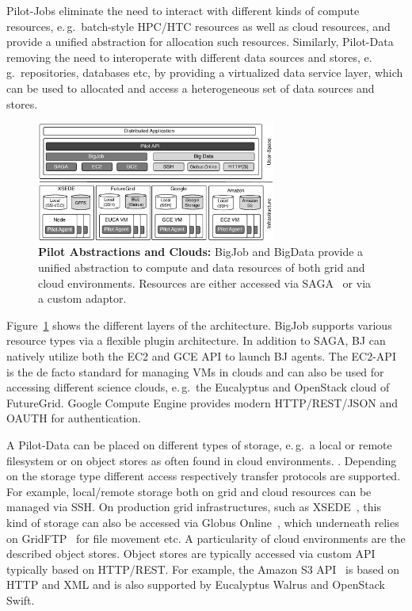 \documentclass[times]{cpeauth}
\newcommand{\pilotjobs}{Pilot-Jobs\xspace}
\newcommand{\pilotdata}{Pilot-Data\xspace}
\begin{document}
\pilotjobs eliminate the need to interact with different kinds of compute 
resources, e.\,g.\ batch-style HPC/HTC resources as well as cloud resources, 
and provide a unified abstraction for allocation such resources. Similarly, 
\pilotdata removing the need to interoperate with different data sources and 
stores, e.\,g.\ repositories, databases etc, by providing a virtualized data 
service layer, which can be used to allocated and access a heterogeneous set 
of data sources and stores.

\begin{figure}[t]
	\centering
		\includegraphics[width=0.7\textwidth]{figures/cloud_pilot_job.pdf}
	\caption{\textbf{Pilot Abstractions and Clouds:} BigJob and BigData 
	provide a unified abstraction to compute and data resources of both grid 
	and cloud environments. Resources are either accessed via 
	SAGA~\cite{ogf-gfd-90,saga-bliss-pd} or via a custom adaptor.}
	\label{fig:figures_cloud_pilot_job}
\end{figure}

Figure~\ref{fig:figures_cloud_pilot_job} shows the different layers of the
architecture. BigJob supports various resource types via a flexible plugin
architecture. In addition to SAGA, BJ can natively utilize both the EC2 and
GCE API to launch BJ agents. The EC2-API~\cite{amazonec2api} is the de facto 
standard for managing VMs in clouds and can also be used for accessing 
different science clouds, e.\,g.\ the Eucalyptus and OpenStack cloud of 
FutureGrid. Google Compute Engine provides modern HTTP/REST/JSON and OAUTH for 
authentication. 

A \pilotdata can be placed on different types of storage, e.\,g.\ a local or
remote filesystem or on object stores as often found in cloud environments. .
Depending on the storage type different access respectively transfer protocols
are supported. For example, local/remote storage both on grid and cloud
resources can be managed via SSH. On production grid infrastructures, such as
XSEDE~\cite{xsede}, this kind of storage can also be accessed via Globus
Online~\cite{10.1109/MIC.2011.64}, which underneath relies on
GridFTP~\cite{ogf-gfd-20} for file movement etc. A particularity of cloud
environments are the described object stores. Object stores are typically
accessed via custom API typically based on HTTP/REST. For example, the Amazon
S3 API~\cite{amazons3api} is based on HTTP and XML and is also supported by
Eucalyptus Walrus and OpenStack Swift.
\end{document}
